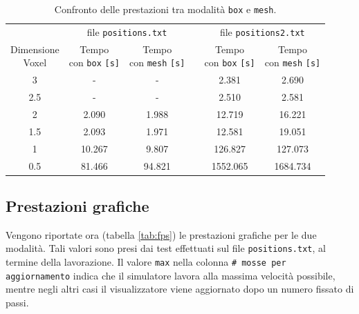 \begin{center}
  \begin{table}[hb]
   \centering
      \begin{tabular}{cccccc}
        \toprule
        & \multicolumn{2}{c}{file \texttt{positions.txt}} & & \multicolumn{2}{c}{file \texttt{positions2.txt}}\\
        \cmidrule(r){2-3}\cmidrule(r){5-6}
          \shortstack{Dimensione\\ Voxel} & \shortstack{Tempo \\con \texttt{box} \texttt{[s]}} & \shortstack{Tempo \\con \texttt{mesh} \texttt{[s]}} & & \shortstack{Tempo \\con \texttt{box} \texttt{[s]}} & \shortstack{Tempo \\con \texttt{mesh} \texttt{[s]}}\\
        \midrule
          3   & -      & -      & & 2.381    & 2.690    \\
          2.5 & -      & -      & & 2.510    & 2.581    \\
          2   & 2.090  & 1.988  & & 12.719   & 16.221   \\
          1.5 & 2.093  & 1.971  & & 12.581   & 19.051   \\
          1   & 10.267 & 9.807  & & 126.827  & 127.073  \\
          0.5 & 81.466 & 94.821 & & 1552.065 & 1684.734 \\
        \bottomrule
      \end{tabular}
      \caption{Confronto delle prestazioni tra modalità \texttt{box} e \texttt{mesh}.}
      \label{tab:confrontoBoxMesh}
  \end{table}
\end{center}

\subsection{Prestazioni grafiche}
Vengono riportate ora (tabella \ref{tab:fps}) le prestazioni grafiche per le due modalità. Tali valori sono presi dai test effettuati sul file \texttt{positions.txt}, al termine della lavorazione. Il valore \texttt{max} nella colonna \texttt{\# mosse per aggiornamento} indica che il simulatore lavora alla massima velocità possibile, mentre negli altri casi il visualizzatore viene aggiornato dopo un numero fissato di passi.

